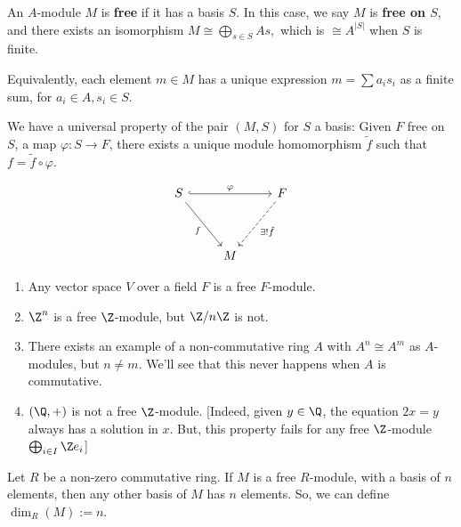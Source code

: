 \begin{defn}
    An $A$-module $M$ is \textbf{free} if it has a basis $S$. In this case, we say $M$ is \textbf{free on $S$}, and there exists an isomorphism $M \cong \bigoplus_{s \in S}As,$ which is $\cong A^{|S|}$ when $S$ is finite.

    Equivalently, each element $m \in M$ has a unique expression $m = \sum a_is_i$ as a finite sum, for $a_i \in A,s_i \in S$.
\end{defn}

\begin{thm}
    We have a universal property of the pair $(M,S)$ for $S$ a basis: Given $F$ free on $S$, a map $\varphi : S \to F$, there exists a unique module homomorphism $\tilde f$ such that $f = \tilde f \circ \varphi$.
\end{thm}

\[\begin{tikzcd}
	S && F \\
	\\
	& M
	\arrow["\varphi", hook, from=1-1, to=1-3]
	\arrow["f"', from=1-1, to=3-2]
	\arrow["{\exists ! \tilde f}", dashed, from=1-3, to=3-2]
\end{tikzcd}\]

\begin{ex}
    \begin{enumerate}
        \item Any vector space $V$ over a field $F$ is a free $F$-module.
        \item $\Z^n$ is a free $\Z$-module, but $\Z/n\Z$ is not.
        \item There exists an example of a non-commutative ring $A$ with $A^n \cong A^m$ as $A$-modules, but $n \neq m$. We'll see that this never happens when $A$ is commutative.
        \item $(\Q,+)$ is not a free $\Z$-module. [Indeed, given $y \in \Q$, the equation $2x=y$ always has a solution in $x$. But, this property fails for any free $\Z$-module $\bigoplus_{i \in I}\Z e_i$]
    \end{enumerate}
\end{ex}

\begin{prop}
    Let $R$ be a non-zero commutative ring. If $M$ is a free $R$-module, with a basis of $n$ elements, then any other basis of $M$ has $n$ elements. So, we can define $\dim _R(M) := n$.
\end{prop}

